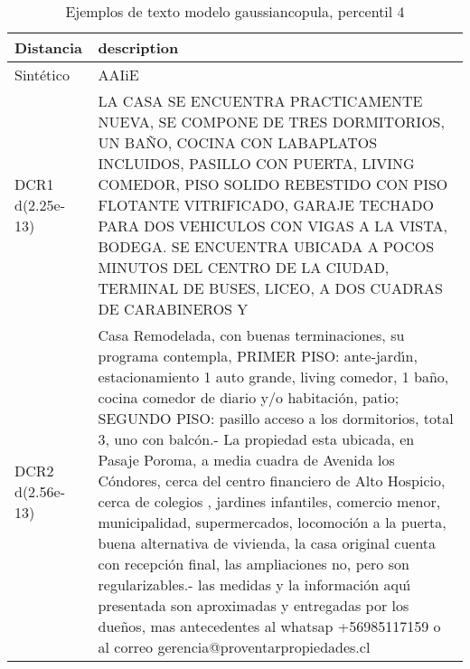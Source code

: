 \begin{table}[H]
\centering
\fontsize{10}{14}\selectfont
\caption{Ejemplos de texto modelo gaussiancopula, percentil 4}
\label{table-example-economicos-b-2-gaussiancopula-4p-text}
\begin{tabular}{|l|m{35em}|}
\hline
\rowcolor[gray]{0.8}
Distancia & description \\
\hline Sintético & AAIiE \\
\hline DCR1 d(2.25e-13) & LA CASA SE ENCUENTRA PRACTICAMENTE NUEVA, SE COMPONE DE TRES DORMITORIOS, UN BA\~NO, COCINA CON LABAPLATOS INCLUIDOS, PASILLO CON PUERTA, LIVING COMEDOR, PISO SOLIDO REBESTIDO CON PISO FLOTANTE VITRIFICADO, GARAJE TECHADO PARA DOS VEHICULOS CON VIGAS A LA VISTA, BODEGA. SE ENCUENTRA UBICADA A POCOS MINUTOS DEL CENTRO DE LA CIUDAD, TERMINAL DE BUSES, LICEO, A DOS CUADRAS DE CARABINEROS Y  \\
\hline DCR2 d(2.56e-13) & Casa Remodelada, con buenas terminaciones, su programa contempla, PRIMER PISO: ante-jard{\'\i}n, estacionamiento 1 auto grande, living comedor, 1 ba\~no, cocina comedor de diario y/o habitaci\'on, patio; SEGUNDO PISO: pasillo acceso a los dormitorios, total 3, uno con balc\'on.- La propiedad esta ubicada, en Pasaje Poroma, a media cuadra de Avenida los C\'ondores, cerca del centro financiero de Alto Hospicio, cerca de colegios , jardines infantiles, comercio menor, municipalidad, supermercados, locomoci\'on a la puerta, buena alternativa de vivienda, la casa original cuenta con recepci\'on final, las ampliaciones no, pero son regularizables.-
las medidas y la informaci\'on aqu{\'\i} presentada son aproximadas y entregadas por los due\~nos, mas antecedentes al whatsap +56985117159 o al correo gerencia@proventarpropiedades.cl
  \\
\hline
\end{tabular}
\end{table}
